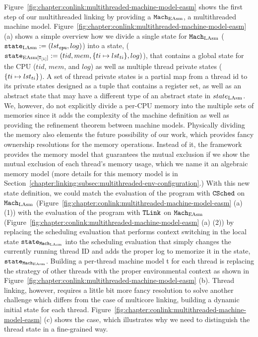Figure~\ref{fig:chapter:conlink:multithreaded-machine-model-easm} shows
the first step of our multithreaded linking by providing 
a ${\mathrm{\texttt{Mach}}}_{\mathrm{EAsm}}$, a multithreaded machine model.
Figure~\ref{fig:chapter:conlink:multithreaded-machine-model-easm} (a)
shows a simple overview how we divide a single state for ${\mathrm{\texttt{Mach}}}_{\mathrm{LAsm}}$  (${\mathrm{\texttt{state}}}_{\mathrm{LAsm}} := (lst_{{\mathrm{\texttt{cpu}}}}, log)$)
into a state, (${\mathrm{\texttt{state}}}_{\mathrm{EAsm}[{{\mathrm{\texttt{T}}}_{[1]}}]} := (tid, mem, \{ti \mapsto lst_{ti}\}, log)$),
that contains a global state for the CPU ($tid$, $mem$, and $log$) as well as 
multiple thread private states ($\{ti \mapsto lst_{ti}\}$).
A set of thread private states is a partial map from a thread id to its private states designed as a tuple that contains
a register set, as well as an abstract state that may have a different type of an abstract state in $state_{\mathrm{LAsm}}$. 
We, however, do not explicitly divide a per-CPU memory into the multiple sets of memories since 
it adds the complexity of the machine definition as well as providing the 
refinement theorem between machine models.
Physically dividing the memory also elements the future possibility of our work, which provides fancy ownership resolutions
for the memory operations.
Instead of it, the framework provides the memory model 
that guarantees the mutual exclusion if we show the mutual exclusion of each thread's memory usage, which we name it an algebraic memory model (more details for this memory model is in Section~\ref{chapter:linking:subsec:multithreaded-env-configuration}.)
With this new state definition, 
we could match the evaluation of the program with ${{\mathrm{\texttt{CSched}}}}$ on ${\mathrm{\texttt{Mach}}}_{\mathrm{LAsm}}$ (Figure~\ref{fig:chapter:conlink:multithreaded-machine-model-easm} (a) (1)) with  the evaluation of the program with ${{\mathrm{\texttt{TLink}}}}$ on ${\mathrm{\texttt{Mach}}}_{\mathrm{EAsm}}$
(Figure~\ref{fig:chapter:conlink:multithreaded-machine-model-easm} (a) (2)) 
by replacing the scheduling evaluation that performs context switching in the local state ${\mathrm{\texttt{state}}}_{{\mathrm{\texttt{Mach}}}_{\mathrm{LAsm}}}$
into  the scheduling evaluation that simply changes the currently running thread ID and 
adds the proper log to memorize it in the state, ${\mathrm{\texttt{state}}}_{{\mathrm{\texttt{Mach}}}_{\mathrm{EAsm}}}$.
Building a per-thread machine model t for each thread 
is replacing the strategy of other threads with the proper environmental context as shown in Figure~\ref{fig:chapter:conlink:multithreaded-machine-model-easm} (b).
Thread linking, however, requires a little bit more fancy resolution to solve another challenge which differs from the case of multicore linking, building a dynamic initial state for each thread.
Figure~\ref{fig:chapter:conlink:multithreaded-machine-model-easm} (c) 
shows the case, which illustrates why we need to distinguish the thread state in a fine-grained way. 






